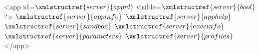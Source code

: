 <app id=$\xmlstructref{server}{appid}$ visible=$\xmlstructref{server}{bool}$?>
  $\xmlstructref{server}{appinfo}$
  $\xmlstructref{server}{apphelp}$
  $\xmlstructref{server}{sandbox}$
  $\xmlstructref{server}{execinfo}$
  $\xmlstructref{server}{parameters}$
  $\xmlstructref{server}{profiles}$
</app>
